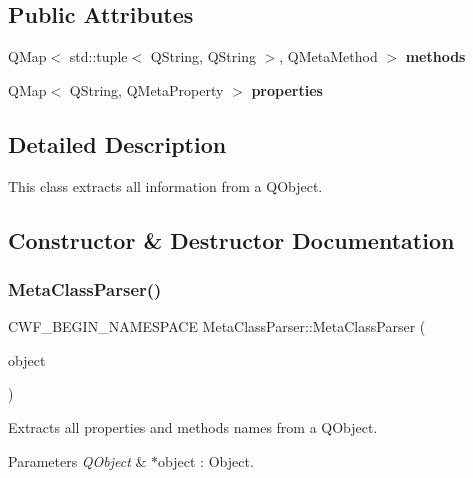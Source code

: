 \subsection*{Public Attributes}
\begin{DoxyCompactItemize}
\item 
\mbox{\label{class_meta_class_parser_a4c5651fa8ac8528bc01c0d2406a89c28}} 
Q\+Map$<$ std\+::tuple$<$ Q\+String, Q\+String $>$, Q\+Meta\+Method $>$ {\bfseries methods}
\item 
\mbox{\label{class_meta_class_parser_ac79cc08f53b738fdb4e3c57d48474ac8}} 
Q\+Map$<$ Q\+String, Q\+Meta\+Property $>$ {\bfseries properties}
\end{DoxyCompactItemize}


\subsection{Detailed Description}
This class extracts all information from a Q\+Object. 

\subsection{Constructor \& Destructor Documentation}
\mbox{\label{class_meta_class_parser_ae3df53e78d823b2edaa38fe6184c9e01}} 
\subsubsection{\texorpdfstring{Meta\+Class\+Parser()}{MetaClassParser()}}
{\footnotesize\ttfamily C\+W\+F\+\_\+\+B\+E\+G\+I\+N\+\_\+\+N\+A\+M\+E\+S\+P\+A\+CE Meta\+Class\+Parser\+::\+Meta\+Class\+Parser (\begin{DoxyParamCaption}\item[{Q\+Object $\ast$}]{object }\end{DoxyParamCaption})\hspace{0.3cm}{\ttfamily [explicit]}}



Extracts all properties and methods names from a Q\+Object. 


\begin{DoxyParams}{Parameters}
{\em Q\+Object} & $\ast$object \+: Object. \\
\hline
\end{DoxyParams}


